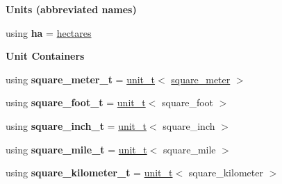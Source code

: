 \begin{Indent}{\bf Units (abbreviated names)}\par
\begin{DoxyCompactItemize}
\item 
\hypertarget{namespaceunits_1_1area_a04a0b77f5d45673c23b2499c39332e5b}{}using {\bfseries ha} = \hyperlink{structunits_1_1unit}{hectares}\label{namespaceunits_1_1area_a04a0b77f5d45673c23b2499c39332e5b}

\end{DoxyCompactItemize}
\end{Indent}
\begin{Indent}{\bf Unit Containers}\par
{\em \label{namespaceunits_1_1area_areaContainers}%
\hypertarget{namespaceunits_1_1area_areaContainers}{}%
}\begin{DoxyCompactItemize}
\item 
\hypertarget{namespaceunits_1_1area_adfff6a6bc333c4b800795ae3d0620a42}{}using {\bfseries square\+\_\+meter\+\_\+t} = \hyperlink{classunits_1_1unit__t}{unit\+\_\+t}$<$ \hyperlink{structunits_1_1unit}{square\+\_\+meter} $>$\label{namespaceunits_1_1area_adfff6a6bc333c4b800795ae3d0620a42}

\item 
\hypertarget{namespaceunits_1_1area_ae0e54422cdb5690b48909a7357c90176}{}using {\bfseries square\+\_\+foot\+\_\+t} = \hyperlink{classunits_1_1unit__t}{unit\+\_\+t}$<$ square\+\_\+foot $>$\label{namespaceunits_1_1area_ae0e54422cdb5690b48909a7357c90176}

\item 
\hypertarget{namespaceunits_1_1area_a4121a7480dafae5037c9d4dd5f9b6e8c}{}using {\bfseries square\+\_\+inch\+\_\+t} = \hyperlink{classunits_1_1unit__t}{unit\+\_\+t}$<$ square\+\_\+inch $>$\label{namespaceunits_1_1area_a4121a7480dafae5037c9d4dd5f9b6e8c}

\item 
\hypertarget{namespaceunits_1_1area_a93042150e5b241b356b8696e4819ed00}{}using {\bfseries square\+\_\+mile\+\_\+t} = \hyperlink{classunits_1_1unit__t}{unit\+\_\+t}$<$ square\+\_\+mile $>$\label{namespaceunits_1_1area_a93042150e5b241b356b8696e4819ed00}

\item 
\hypertarget{namespaceunits_1_1area_a44a7ab6486cf920ab4deeaf008c8923a}{}using {\bfseries square\+\_\+kilometer\+\_\+t} = \hyperlink{classunits_1_1unit__t}{unit\+\_\+t}$<$ square\+\_\+kilometer $>$\label{namespaceunits_1_1area_a44a7ab6486cf920ab4deeaf008c8923a}


\end{DoxyCompactItemize}
\end{Indent}

